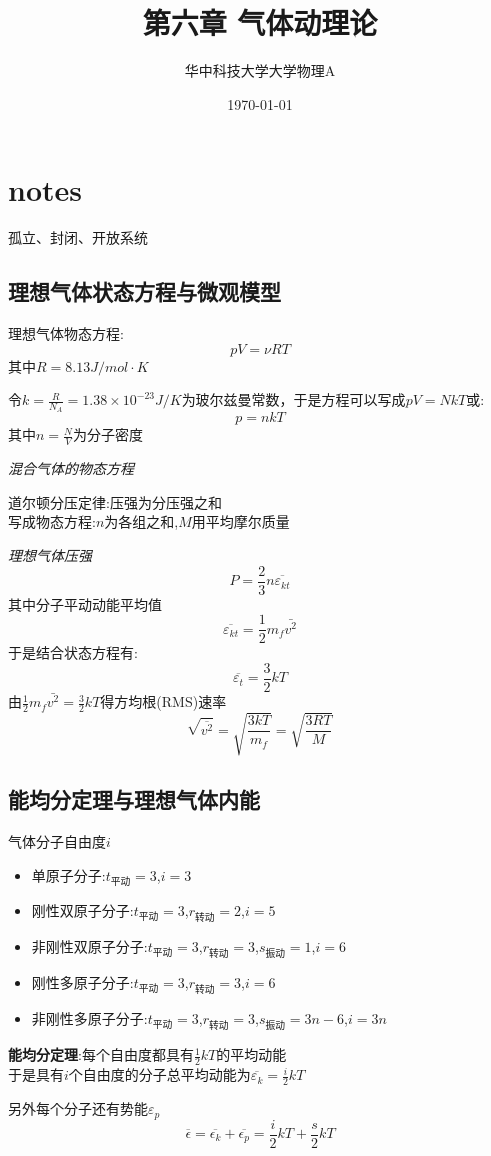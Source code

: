 \documentclass[10pt,a4paper]{article}
\title{第六章 气体动理论}
\author{华中科技大学大学物理A}
\date{\today}
\begin{document}
\maketitle
\section{notes}
孤立、封闭、开放系统
\subsection{理想气体状态方程与微观模型}
理想气体物态方程:
\[pV=\nu RT\]
其中$R=8.13J/mol\cdot K$

令$k=\frac{R}{N_A}=1.38\times10^{-23}J/K$为玻尔兹曼常数，于是方程可以写成$pV=NkT$或:
\[\boxed{p=nkT}\]
其中$n=\frac{N}{V}$为分子密度

\textit{混合气体的物态方程}

道尔顿分压定律:压强为分压强之和\\
写成物态方程:$n$为各组之和,$M$用平均摩尔质量

\textit{理想气体压强}
\[P=\frac{2}{3}n\overline{\varepsilon_{kt}}\]
其中分子平动动能平均值
\[\overline{\varepsilon_{kt}}=\frac{1}{2}m_f\bar{v^2}\]
于是结合状态方程有:
\[\overline{\varepsilon_t}=\frac{3}{2}kT\]
由$\frac{1}{2}m_f\bar{v^2}=\frac{3}{2}kT$得方均根(RMS)速率
\[\sqrt{\overline{v^2}}=\sqrt{\frac{3kT}{m_f}}=\sqrt{\frac{3RT}{M}}\]
\subsection{能均分定理与理想气体内能}
气体分子自由度$i$

\begin{itemize}
\item 单原子分子:$t_{\text{平动}}=3$,$i=3$
\item 刚性双原子分子:$t_{\text{平动}}=3$,$r_{\text{转动}}=2$,$i=5$
\item 非刚性双原子分子:$t_{\text{平动}}=3$,$r_{\text{转动}}=3$,$s_{\text{振动}}=1$,$i=6$
\item 刚性多原子分子:$t_{\text{平动}}=3$,$r_{\text{转动}}=3$,$i=6$
\item 非刚性多原子分子:$t_{\text{平动}}=3$,$r_{\text{转动}}=3$,$s_{\text{振动}}=3n-6$,$i=3n$
\end{itemize} 
\textbf{能均分定理}:每个自由度都具有$\frac{1}{2}kT$的平均动能\\
于是具有$i$个自由度的分子总平均动能为$\overline{\varepsilon_k}=\frac{i}{2}kT$

另外每个分子还有势能$\varepsilon_p$
\[\overline{\epsilon}=\overline{\epsilon_k}+\overline{\epsilon_p}=\frac{i}{2}kT+\frac{s}{2}kT\]
\end{document}
